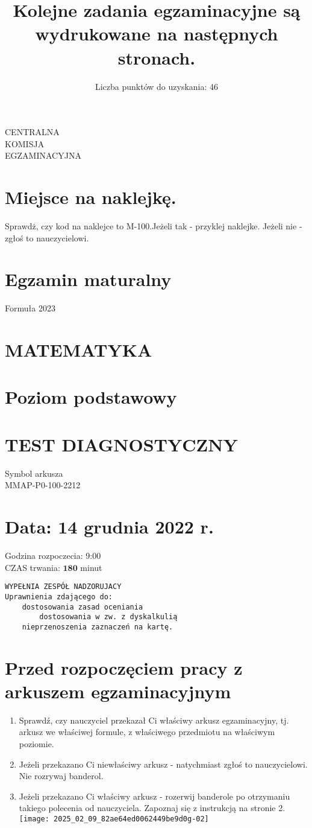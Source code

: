 \documentclass[10pt]{article}
\title{Kolejne zadania egzaminacyjne są wydrukowane na następnych stronach. }
\author{Liczba punktów do uzyskania: 46}
\date{}
\begin{document}
\maketitle
CENTRALNA\\
KOMISJA\\
EGZAMINACYJNA

\section*{Miejsce na naklejkę.}
 Sprawdż, czy kod na naklejce to M-100.Jeżeli tak - przyklej naklejke. Jeżeli nie - zgłoś to nauczycielowi.

\section*{Egzamin maturalny}
Formuła 2023

\section*{MATEMATYKA}
\section*{Poziom podstawowy}
\section*{TEST DIAGNOSTYCZNY}
Symbol arkusza\\
MMAP-P0-100-2212

\section*{Data: \(\mathbf{1 4}\) grudnia 2022 r.}
Godzina rozpoczecia: 9:00\\
CZAS trwania: \(\mathbf{1 8 0}\) minut

\begin{verbatim}
WYPEŁNIA ZESPÓŁ NADZORUJACY
Uprawnienia zdającego do:
    dostosowania zasad oceniania
        dostosowania w zw. z dyskalkulią
    nieprzenoszenia zaznaczeń na kartę.
\end{verbatim}



\section*{Przed rozpoczęciem pracy z arkuszem egzaminacyjnym}
\begin{enumerate}
  \item Sprawdź, czy nauczyciel przekazał Ci właściwy arkusz egzaminacyjny, tj. arkusz we właściwej formule, z właściwego przedmiotu na właściwym poziomie.
  \item Jeżeli przekazano Ci niewłaściwy arkusz - natychmiast zgłoś to nauczycielowi. Nie rozrywaj banderol.
  \item Jeżeli przekazano Ci właściwy arkusz - rozerwij banderole po otrzymaniu takiego polecenia od nauczyciela. Zapoznaj się z instrukcją na stronie 2.\\
\texttt{[image: 2025\_02\_09\_82ae64ed0062449be9d0g-02]}
\end{enumerate}
\end{document}
